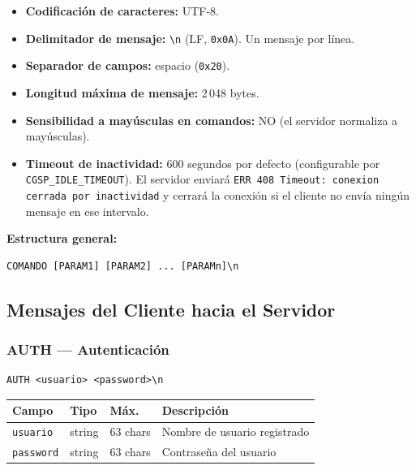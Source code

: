 \documentclass[12pt, letterpaper]{article}
\begin{document}
\begin{itemize}[leftmargin=2em]
    \item \textbf{Codificación de caracteres:} UTF-8.
    \item \textbf{Delimitador de mensaje:} \texttt{\textbackslash{}n} (LF, \texttt{0x0A}). Un mensaje por línea.
    \item \textbf{Separador de campos:} espacio (\texttt{0x20}).
    \item \textbf{Longitud máxima de mensaje:} 2\,048 bytes.
    \item \textbf{Sensibilidad a mayúsculas en comandos:} NO (el servidor normaliza a mayúsculas).
    \item \textbf{Timeout de inactividad:} 600 segundos por defecto (configurable por \texttt{CGSP\_IDLE\_TIMEOUT}). El servidor enviará \texttt{ERR 408 Timeout: conexion cerrada por inactividad} y cerrará la conexión si el cliente no envía ningún mensaje en ese intervalo.
\end{itemize}

\textbf{Estructura general:}
\begin{lstlisting}
COMANDO [PARAM1] [PARAM2] ... [PARAMn]\n
\end{lstlisting}

\subsection{Mensajes del Cliente hacia el Servidor}

\subsubsection{AUTH --- Autenticación}

\begin{lstlisting}
AUTH <usuario> <password>\n
\end{lstlisting}

\begin{table}[H]
\centering
\begin{tabularx}{\textwidth}{l l l X}
\toprule
\textbf{Campo} & \textbf{Tipo} & \textbf{Máx.} & \textbf{Descripción} \\
\midrule
\texttt{usuario}  & string & 63 chars & Nombre de usuario registrado \\
\texttt{password} & string & 63 chars & Contraseña del usuario \\
\bottomrule
\end{tabularx}
\end{table}
\end{document}
